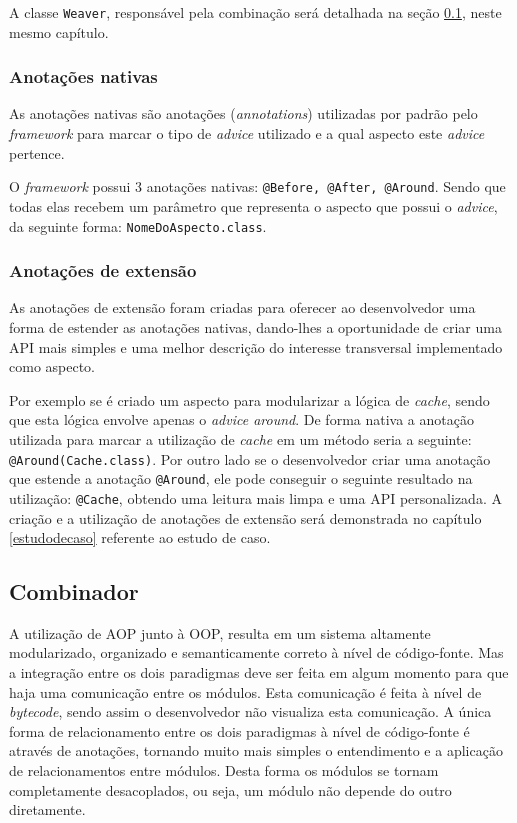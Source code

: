 \documentclass[tc,oneside]{iiufrgs}
\begin{document}
A classe \texttt{Weaver}, responsável pela combinação será detalhada na seção  \ref{combinacao}, neste mesmo capítulo.

\subsubsection{Anotações nativas}

As anotações nativas são anotações (\textit{annotations}) utilizadas por padrão pelo \textit{framework} para marcar o tipo de \textit{advice} utilizado e a qual aspecto este \textit{advice} pertence. 

O \textit{framework} possui 3 anotações nativas: \texttt{@Before, @After, @Around}. Sendo que todas elas recebem um parâmetro que representa o aspecto que possui o \textit{advice}, da seguinte forma: \texttt{NomeDoAspecto.class}.

\subsubsection{Anotações de extensão}

As anotações de extensão foram criadas para oferecer ao desenvolvedor uma forma de estender as anotações nativas, dando-lhes a oportunidade de criar uma API mais simples e uma melhor descrição do interesse transversal implementado como aspecto.

Por exemplo se é criado um aspecto para modularizar a lógica de \textit{cache}, sendo que esta lógica envolve apenas o \textit{advice around}. De forma nativa a anotação utilizada para marcar a utilização de \textit{cache} em um método seria a seguinte: \texttt{@Around(Cache.class)}. Por outro lado se o desenvolvedor criar uma anotação que estende a anotação \texttt{@Around}, ele pode conseguir o seguinte resultado na utilização: \texttt{@Cache}, obtendo uma leitura mais limpa e uma API personalizada. A criação e a utilização de anotações de extensão será demonstrada no capítulo \ref{estudodecaso} referente ao estudo de caso.

\subsection{Combinador}
\label{combinacao}

A utilização de AOP junto à OOP, resulta em um sistema altamente modularizado, organizado e semanticamente correto à nível de código-fonte. Mas a integração entre os dois paradigmas deve ser feita em algum momento para que haja uma comunicação entre os módulos. Esta comunicação é feita à nível de \textit{bytecode}, sendo assim o desenvolvedor não visualiza esta comunicação. A única forma de relacionamento entre os dois paradigmas à nível de código-fonte é através de anotações, tornando muito mais simples o entendimento e a aplicação de relacionamentos entre módulos. Desta forma os módulos se tornam completamente desacoplados, ou seja, um módulo não depende do outro diretamente.
\end{document}
